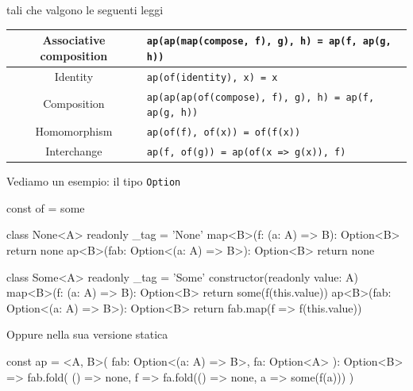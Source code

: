 \documentclass[12pt]{article}
\theoremstyle{definition}
\newenvironment{code}
  {\vspace{0.5cm} \VerbatimEnvironment\begin{typescriptcode}}
  {\end{typescriptcode} \vspace{0.2cm}}
\begin{document}
tali che valgono le seguenti leggi

\begin{center}
\bgroup
\def\arraystretch{1.5}
\begin{tabular}{ |c|p{10cm}| }
\hline
Associative composition & \texttt{ap(ap(map(compose, f), g), h) = ap(f, ap(g, h))} \\
\hline
Identity & \texttt{ap(of(identity), x) = x} \\
\hline
Composition & \texttt{ap(ap(ap(of(compose), f), g), h) = ap(f, ap(g, h))} \\
\hline
Homomorphism & \texttt{ap(of(f), of(x)) = of(f(x))} \\
\hline
Interchange & \texttt{ap(f, of(g)) = ap(of(x => g(x)), f)} \\
\hline
\end{tabular}
\egroup
\end{center}

Vediamo un esempio: il tipo \texttt{Option}

\begin{code}
const of = some

class None<A> {
  readonly _tag = 'None'
  map<B>(f: (a: A) => B): Option<B> {
    return none
  }
  ap<B>(fab: Option<(a: A) => B>): Option<B> {
    return none
  }
}

class Some<A> {
  readonly _tag = 'Some'
  constructor(readonly value: A) {}
  map<B>(f: (a: A) => B): Option<B> {
    return some(f(this.value))
  }
  ap<B>(fab: Option<(a: A) => B>): Option<B> {
    return fab.map(f => f(this.value))
  }
}
\end{code}

Oppure nella sua versione statica

\begin{code}
const ap = <A, B>(
  fab: Option<(a: A) => B>,
  fa: Option<A>
): Option<B> =>
  fab.fold(
    () => none,
    f => fa.fold(() => none, a => some(f(a)))
  )
\end{code}



\end{document}
